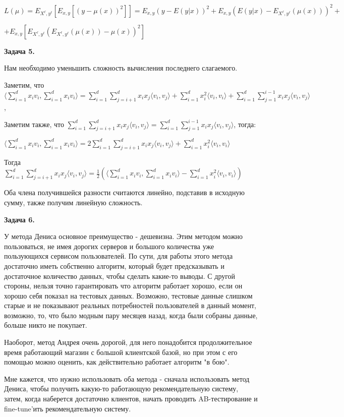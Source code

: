 \documentclass{article}
\begin{document}
    \Rightarrow $L(\mu)=E_{X^\ell,y^\ell}[E_{x,y}[(y-\mu(x))^2]]=E_{x,y}(y-E(y|x))^2+E_{x,y}(E(y|x)-E_{X^\ell,y^\ell}(\mu(x)))^2+$

    $+E_{x,y}[E_{X^\ell,y^\ell}(E_{X^\ell,y^\ell}(\mu(x))-\mu(x))^2]$

    \textbf{Задача 5.}

    Нам необходимо уменьшить сложность вычисления последнего слагаемого.

    Заметим, что $\langle\sum_{i=1}^{d}x_{i}v_{i},\sum_{i=1}^{d}x_{i}v_{i}\rangle=\sum_{i=1}^{d}\sum_{j=i+1}^{d}x_{i}x_{j}\langle v_{i},v_{j}\rangle+\sum_{i=1}^{d}x_{i}^{2}\langle v_{i},v_{i}\rangle+\sum_{i=1}^{d}\sum_{j=1}^{i-1}x_{i}x_{j}\langle v_{i},v_{j}\rangle$,

    Заметим также, что $\sum_{i=1}^{d}\sum_{j=i+1}^{d}x_{i}x_{j}\langle v_{i},v_{j}\rangle=\sum_{i=1}^{d}\sum_{j=1}^{i-1}x_{i}x_{j}\langle v_{i},v_{j}\rangle$, тогда:

    $\langle\sum_{i=1}^{d}x_{i}v_{i},\sum_{i=1}^{d}x_{i}v_{i}\rangle=2\sum_{i=1}^{d}\sum_{j=i+1}^{d}x_{i}x_{j}\langle v_{i},v_{j}\rangle+\sum_{i=1}^{d}x_{i}^{2}\langle v_{i},v_{i}\rangle$

    Тогда $\sum_{i=1}^{d}\sum_{j=i+1}^{d}x_{i}x_{j}\langle v_{i},v_{j}\rangle=\frac{1}{2}(\langle\sum_{i=1}^{d}x_{i}v_{i},\sum_{i=1}^{d}x_{i}v_{i}\rangle-\sum_{i=1}^{d}x_{i}^{2}\langle v_{i},v_{i}\rangle)$

    Оба члена получившейся разности считаются линейно, подставив в исходную сумму, также получим линейную сложность.

    \textbf{Задача 6.}

    У метода Дениса основное преимущество - дешевизна.
    Этим методом можно пользоваться, не имея дорогих серверов и большого количества уже пользующихся сервисом пользователей.
    По сути, для работы этого метода достаточно иметь собственно алгоритм, который будет предсказывать и достаточное количество данных, чтобы сделать какие-то выводы.
    С другой стороны, нельзя точно гарантировать что алгоритм работает хорошо, если он хорошо себя показал на тестовых данных.
    Возможно, тестовые данные слишком старые и не показывают реальных потребностей пользователей в данный момент, возможно, то, что было модным пару месяцев назад, когда были собраны данные, больше никто не покупает.

    Наоборот, метод Андрея очень дорогой, для него понадобится продолжительное время работающий магазин с большой клиентской базой,
    но при этом с его помощью можно оценить, как действительно работает алгоритм "в бою".

    Мне кажется, что нужно использовать оба метода - сначала использовать метод Дениса, чтобы получить какую-то работающую рекомендательную систему,
    затем, когда наберется достаточно клиентов, начать проводить AB-тестирование и fine-tune'ить рекомендательную систему.
\end{document}

